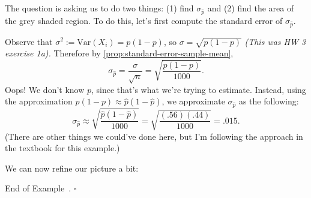\documentclass[10pt]{article}
\theoremstyle{definition}
\newtheorem{example}[theorem]{Example}
\renewenvironment{example}
{\begin{oldexample}}
  {\par\smallskip\hfill   End of Example~\theexample. $\square$    \par\end{oldexample}}
\newcommand{\1}[1]{\textbf{1}_{\left[#1\right]}} %
\def\Var{\mathrm{Var}} %
\begin{document}
\begin{example}[Example 8.2 in textbook]
  The question is asking us to do two things: (1) find $\sigma_{\widehat{p}}$
  and (2) find the area of the grey shaded region. To do this, let's first
  compute the standard error of $\sigma_{\widehat{p}}$.

  Observe that $\sigma^{2}:=\Var(X_{i})=p(1-p)$, so $\sigma = \sqrt{p(1-p)}$ \textit{(This was
    HW 3 exercise 1a).}
  Therefore by \cref{prop:standard-error-sample-mean},
  \begin{equation*}
    \sigma_{\widehat{p}} = \frac{\sigma}{\sqrt{n}}=\sqrt{\frac{p(1-p)}{1000}}.
  \end{equation*}
  Oops! We don't know $p$, since that's what we're trying to estimate.
  Instead, using the approximation $p(1-p)\approx \widehat{p}(1-\widehat{p})$,
  we approximate $\sigma_{\widehat{p}}$ as the following:
  \begin{equation}\label{eq:13}
    \sigma_{\widehat{p}} \approx \sqrt{\frac{\widehat{p}(1-\widehat{p})}{1000}} = \sqrt{\frac{(.56)(.44)}{1000}}= .015.
  \end{equation}
  (There are other things we could've done here, but I'm following the
  approach in the textbook for this example.)
  
  We can now refine our picture a bit:

  \begin{center}
  \end{center}


\end{example}
\end{document}
